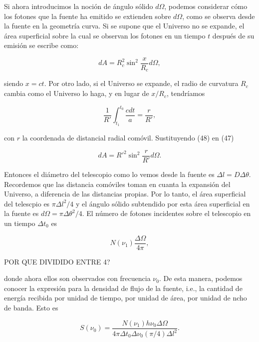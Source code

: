 \documentclass{article}
\begin{document}
    Si ahora introducimos la noción de ángulo sólido $d\Omega$, podemos considerar cómo los fotones que la fuente ha emitido se extienden sobre $d \Omega$, como se observa desde la fuente en la geometría curva. Si se supone que el Universo no se expande, el área superficial sobre la cual se observan los fotones en un tiempo $t$ después de su emisión se escribe como: 

    \begin{equation}
        dA = R_c^2 \sin^2 \frac{x}{R_c} d\Omega,
    \end{equation}

    siendo $x = ct$. Por otro lado, si el Universo se expande, el radio de curvatura $R_c$ cambia como el Universo lo haga, y en lugar de $x/R_c$, tendríamos 

    \begin{equation}
        \frac{1}{R'} \int_{t_1}^{t_0}{\frac{c dt}{a}} =     \frac{r}{R'},
    \end{equation}


    con $r$ la coordenada de distancial radial comóvil. Sustituyendo (48) en (47)

    \begin{equation}
        dA = R'^2 \sin^2 \frac{r}{R'} d\Omega.
    \end{equation} 

    Entonces el diámetro del telescopio como lo vemos desde la fuente es $\Delta l = D \Delta \theta$. Recordemos que las distancia comóviles toman en cuanta la expansión del Universo, a diferencia de las distancias propias. Por lo tanto, el área superficial del telescpio es $\pi \Delta l^2 / 4$ y el ángulo sólido subtendido por esta área superficial en la fuente es $d \Omega = \pi \Delta \theta^2/4$. El número de fotones incidentes sobre el telescopio en un tiempo $\Delta t_0$ es 
    
    \begin{equation}
        N (\nu_1) \frac{\Delta \Omega}{4 \pi},
    \end{equation}

    POR QUE DIVIDIDO ENTRE 4? 
    
    donde ahora ellos son observados con frecuencia $\nu_0$. De esta manera, podemos conocer la expresión para la densidad de flujo de la fuente, i.e., la cantidad de energía recibida por unidad de tiempo, por unidad de área, por unidad de ncho de banda. Esto es
    
    \begin{equation}
        S(\nu_0) = \frac{N (\nu_1) h \nu_0 \Delta \Omega} {4\pi \Delta t_0 \Delta \nu_0 (\pi/4)\Delta l^2 }.
    \end{equation}
\end{document}
